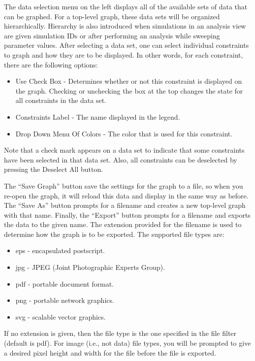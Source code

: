 \documentclass[titlepage,11pt]{article}
\begin{document}
The data selection menu on the left displays all of the
available sets of data that can be graphed.  
For a top-level graph, these
data sets will be organized hierarchically.  Hierarchy is also 
introduced when simulations in an analysis view are given
simulation IDs or after performing an analysis while sweeping parameter
values.  After selecting a data set, one can select individual constraints to 
graph and how they are to be displayed.  In other words, for each 
constraint, there are the following options: 
\begin{itemize}
\item Use Check Box - Determines
whether or not this constraint is displayed on the graph.  Checking or 
unchecking the box at the top changes the state for all constraints in
the data set. 
\item Constraints Label - The name displayed in the legend. 
\item Drop Down Menu Of Colors - The color that is used for this constraint. 
\end{itemize}
Note that a check mark appears on a data set to indicate that some
constraints have been selected in that data set.  Also, all constraints can
be deselected by pressing the Deselect All button.

The ``Save Graph'' button save the settings for the graph to 
a file, so when you re-open the graph, it will reload this data and display 
in the same way as before.  The ``Save As'' button prompts for a 
filename and creates a new top-level graph with that name.  
Finally, the ``Export'' button prompts for a filename and exports
the data to the given name.  The extension provided for the filename 
is used to determine how the graph is to be exported. The
supported file types are: 
\begin{itemize}
\item eps - encapsulated postscript. 
\item jpg - JPEG (Joint Photographic Experts Group). 
\item pdf - portable document format.
\item png - portable network graphics. 
\item svg - scalable vector graphics.
\end{itemize}
If no extension is given, then the file type is the one
specified in the file filter (default is pdf).  For image (i.e.,
not data) file types, you will be prompted to give a desired
pixel height and width for the file before the file is exported. 
\end{document}
